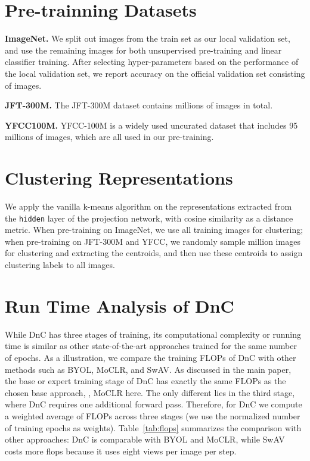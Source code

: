 \documentclass[final]{cvpr}
\newcommand\baseline{MoCLR}
\newcommand\jft{JFT-300M}
\begin{document}
\section{Pre-trainning Datasets}

\noindent\textbf{ImageNet.} We split out  images from the train set as our local validation set, and use the remaining  images for both unsupervised pre-training and linear classifier training. After selecting hyper-parameters based on the performance of the local validation set, we report accuracy on the official validation set consisting of  images.

\noindent\textbf{\jft{}.} The \jft{} dataset contains  millions of images in total.

\noindent\textbf{YFCC100M.} YFCC-100M is a widely used uncurated dataset that includes 95 millions of images, which are all used in our pre-training. 

\section{Clustering Representations}
We apply the vanilla k-means algorithm on the representations extracted from the \texttt{hidden} layer of the projection network, with cosine similarity as a distance metric. When pre-training on ImageNet, we use all training images for clustering; when pre-training on \jft{} and YFCC, we randomly sample  million images for clustering and extracting the centroids, and then use these centroids to assign clustering labels to all images. 

\section{Run Time Analysis of DnC}\label{sec:run_time}

While DnC has three stages of training, its computational complexity or running time is similar as other state-of-the-art approaches trained for the same number of epochs. As a illustration, we compare the training FLOPs of DnC with other methods such as BYOL, \baseline{}, and SwAV. As discussed in the main paper, the base or expert training stage of DnC has exactly the same FLOPs as the chosen base approach, \ie, \baseline{} here. The only different lies in the third stage, where DnC requires one additional forward pass. Therefore, for DnC we compute a weighted average of FLOPs across three stages (we use the normalized number of training epochs as weights). Table~\ref{tab:flops} summarizes the comparison with other approaches: DnC is comparable with BYOL and \baseline{}, while SwAV costs more flops because it uses eight views per image per step.
\end{document}

